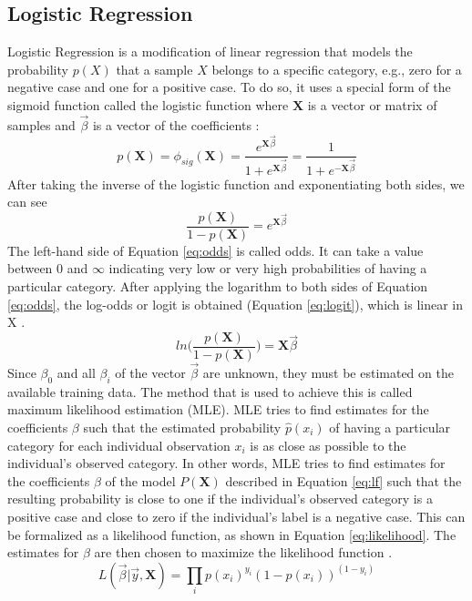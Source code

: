 \subsection{Logistic Regression}
Logistic Regression is a modification of linear regression that models the 
probability $p(X)$ that a sample $X$ belongs to a specific category, e.g., zero 
for a negative case and one for a positive case. To do so, it uses a special 
form of the sigmoid function called the logistic function where $\mathbf{X}$ is 
a vector or matrix of samples and $\vec{\beta}$ is a vector of the coefficients 
\cite{RN170, RN166}:
\begin{equation}
 p(\mathbf{X}) = \phi_{sig}(\mathbf{X}) = 
\frac{e^{\mathbf{X}\vec{\beta}}}{1+e^{\mathbf{X}\vec{\beta}}} = 
\frac{1}{1+e^{-\mathbf{X}\vec{\beta}}}
 \label{eq:lf}
\end{equation}
After taking the inverse of the logistic function and exponentiating both 
sides, we can see
\begin{equation}
 \frac{p(\mathbf{X})}{1-p(\mathbf{X})} = e^{\mathbf{X}\vec{\beta}}
 \label{eq:odds}
\end{equation}
The left-hand side of Equation \ref{eq:odds} is called odds. It can take a 
value between 0 and $\infty$ indicating very low or very high probabilities 
of having a particular category.
After applying the logarithm to both sides of Equation \ref{eq:odds}, the 
log-odds or logit is obtained (Equation \ref{eq:logit}), which is linear in X 
\cite{RN174, RN166}.
\begin{equation}
 ln \Big( \frac{p(\mathbf{X})}{1-p(\mathbf{X})} \Big) = \mathbf{X}\vec{\beta}
 \label{eq:logit}
\end{equation}
Since $\beta_0$ and all $\beta_i$ of the vector $\vec{\beta}$ are unknown, 
they must be estimated on the 
available training data. The method that is used to achieve this is called 
maximum likelihood estimation (MLE). MLE tries to find estimates for the 
coefficients $\beta$ such that the estimated probability $\hat{p}(x_i)$ of 
having a particular category for each individual observation $x_i$ is as close 
as possible to the individual's observed category. In other words, MLE tries to 
find estimates for the coefficients $\beta$ of the model $P(\mathbf{X})$ 
described in Equation \ref{eq:lf} such that the resulting probability is close 
to one if the individual's observed category is a positive case and close to 
zero if the individual's label is a negative case. This can be formalized as a 
likelihood function, as shown in Equation \ref{eq:likelihood}. The estimates 
for $\beta$ are then chosen to maximize the likelihood function \cite{RN166}.
\begin{equation}
 L(\vec{\beta}|\vec{y}, \mathbf{X}) = \prod_{i} p(x_i)^{y_i} 
(1-p(x_i))^{(1-y_i)}
\label{eq:likelihood}
\end{equation}
